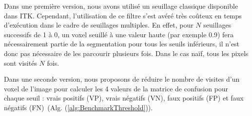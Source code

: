 Dans une première version, nous avons utilisé un seuillage classique disponible dans ITK. Cependant, l'utilisation de ce filtre s'est avéré très coûteux en temps d'exécution dans le cadre de seuillages multiples. En effet, pour $N$ seuillages successifs de 1 à 0, un voxel seuillé à une valeur haute (par exemple 0.9) fera nécessairement partie de la segmentation pour tous les seuils inférieurs, il n'est donc pas nécessaire de les parcourir plusieurs fois. Dans le cas naïf, tous les pixels sont visités $N$ fois.

Dans une seconde version, nous proposons de réduire le nombre de visites d'un voxel de l'image pour calculer les 4 valeurs de la matrice de confusion pour chaque seuil : vrais positifs (VP), vrais négatifs (VN), faux positifs (FP) et faux négatifs (FN)~(Alg. (\ref{alg:BenchmarkThreshold})).

\clearpage

